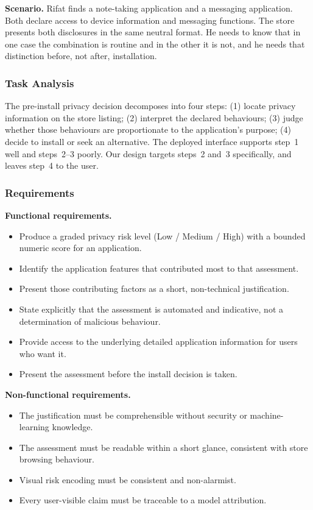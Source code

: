\documentclass[sigconf]{acmart}
\begin{document}
\textbf{Scenario.} Rifat finds a note-taking application and a messaging
application. Both declare access to device information and messaging
functions. The store presents both disclosures in the same neutral format.
He needs to know that in one case the combination is routine and in the
other it is not, and he needs that distinction before, not after,
installation.

\subsubsection{Task Analysis}
The pre-install privacy decision decomposes into four steps: (1) locate
privacy information on the store listing; (2) interpret the declared
behaviours; (3) judge whether those behaviours are proportionate to the
application's purpose; (4) decide to install or seek an alternative. The
deployed interface supports step~1 well and steps~2--3 poorly. Our design
targets steps~2 and~3 specifically, and leaves step~4 to the user.

\subsubsection{Requirements}

\textbf{Functional requirements.}
\begin{itemize}[leftmargin=*, itemsep=1pt]
  \item[FR1] Produce a graded privacy risk level (Low / Medium / High) with
  a bounded numeric score for an application.
  \item[FR2] Identify the application features that contributed most to
  that assessment.
  \item[FR3] Present those contributing factors as a short, non-technical
  justification.
  \item[FR4] State explicitly that the assessment is automated and
  indicative, not a determination of malicious behaviour.
  \item[FR5] Provide access to the underlying detailed application
  information for users who want it.
  \item[FR6] Present the assessment before the install decision is taken.
\end{itemize}

\textbf{Non-functional requirements.}
\begin{itemize}[leftmargin=*, itemsep=1pt]
  \item[NFR1] The justification must be comprehensible without security or
  machine-learning knowledge.
  \item[NFR2] The assessment must be readable within a short glance,
  consistent with store browsing behaviour.
  \item[NFR3] Visual risk encoding must be consistent and
  non-alarmist.
  \item[NFR4] Every user-visible claim must be traceable to a model
  attribution.
\end{itemize}
\end{document}
